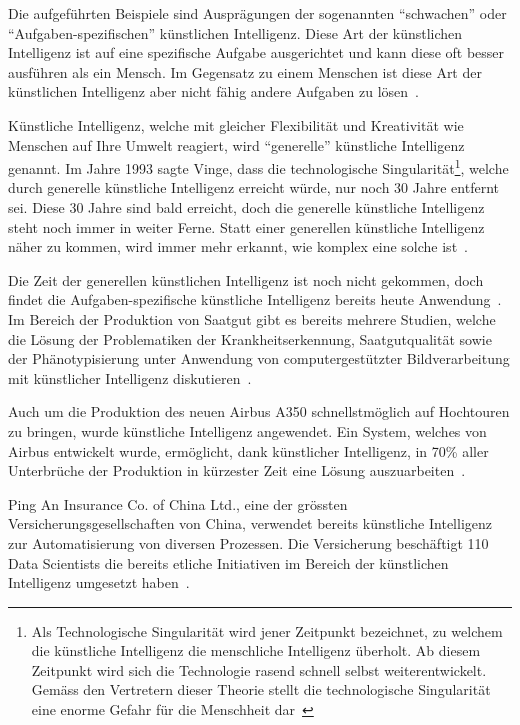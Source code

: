 Die aufgeführten Beispiele sind Ausprägungen der sogenannten \enquote{schwachen} oder \enquote{Aufgaben-spezifischen} künstlichen Intelligenz. Diese Art der künstlichen Intelligenz ist auf eine spezifische Aufgabe ausgerichtet und kann diese oft besser ausführen als ein Mensch. Im Gegensatz zu einem Menschen ist diese Art der künstlichen Intelligenz aber nicht fähig andere Aufgaben zu lösen~\autocite{Lu2018}.

Künstliche Intelligenz, welche mit gleicher Flexibilität und Kreativität wie Menschen auf Ihre Umwelt reagiert, wird \enquote{generelle} künstliche Intelligenz genannt. Im Jahre 1993 sagte Vinge, dass die technologische Singularität\footnote{Als Technologische Singularität wird jener Zeitpunkt bezeichnet, zu welchem die künstliche Intelligenz die menschliche Intelligenz überholt. Ab diesem Zeitpunkt wird sich die Technologie rasend schnell selbst weiterentwickelt. Gemäss den Vertretern dieser Theorie stellt die technologische Singularität eine enorme Gefahr für die Menschheit dar~\autocite{Tredinnick2017}}, welche durch generelle künstliche Intelligenz erreicht würde, nur noch 30 Jahre entfernt sei. Diese 30 Jahre sind bald erreicht, doch die generelle künstliche Intelligenz steht noch immer in weiter Ferne. Statt einer generellen künstliche Intelligenz näher zu kommen, wird immer mehr erkannt, wie komplex eine solche ist~\autocite{Tredinnick2017}.

Die Zeit der generellen künstlichen Intelligenz ist noch nicht gekommen, doch findet die Aufgaben-spezifische künstliche Intelligenz bereits heute Anwendung~\autocite{Tredinnick2017}. Im Bereich der Produktion von Saatgut gibt es bereits mehrere Studien, welche die Lösung der Problematiken der Krankheitserkennung, Saatgutqualität sowie der Phänotypisierung unter Anwendung von computergestützter Bildverarbeitung mit künstlicher Intelligenz diskutieren~\autocite{Patricio2018}. 

Auch um die Produktion des neuen Airbus A350 schnellstmöglich auf Hochtouren zu bringen, wurde künstliche Intelligenz angewendet. Ein System, welches von Airbus entwickelt wurde, ermöglicht, dank künstlicher Intelligenz, in 70\% aller Unterbrüche der Produktion in kürzester Zeit eine Lösung auszuarbeiten~\autocite{Ransbotham2017}.

Ping An Insurance Co. of China Ltd., eine der grössten Versicherungsgesellschaften von China, verwendet bereits künstliche Intelligenz zur Automatisierung von diversen Prozessen. Die Versicherung beschäftigt 110 Data Scientists die bereits etliche Initiativen im Bereich der künstlichen Intelligenz umgesetzt haben~\autocite{Ransbotham2017}.

